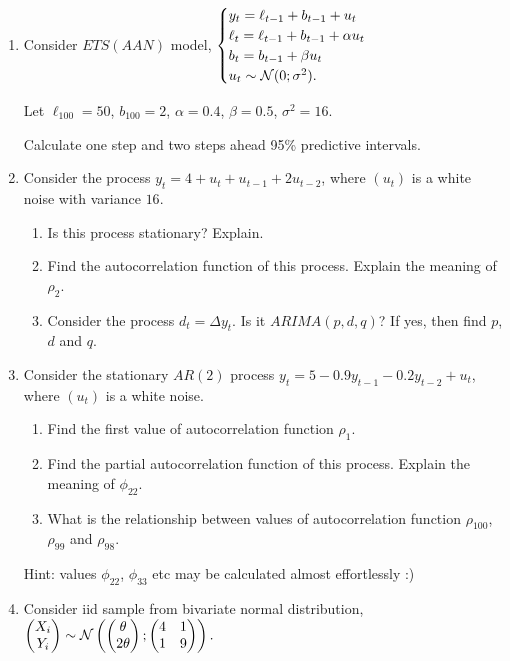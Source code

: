 \begin{enumerate}

\item Consider $ETS(AAN)$ model,
	$
	\begin{cases}
	y_t = \ell_{t-1} + b_{t-1} + u_t \\
	\ell_t = \ell_{t-1} + b_{t-1} + \alpha u_t \\
	b_t = b_{t-1} + \beta u_t \\
	u_t \sim \mathcal{N}(0;\sigma^2). \\
	\end{cases}
	$
		
Let $\ell_{100} = 50$, $b_{100} = 2$, $\alpha=0.4$, $\beta=0.5$, $\sigma^2 = 16$.

Calculate one step and two steps ahead 95\% predictive intervals. 

\item Consider the process $y_t = 4 + u_t + u_{t-1} + 2 u_{t-2}$, where $(u_t)$ is a white noise with variance $16$.

\begin{enumerate}
	\item Is this process stationary? Explain. 
	\item Find the autocorrelation function of this process. Explain the meaning of $\rho_2$.
	\item Consider the process $d_t = \Delta y_t$. Is it $ARIMA(p, d, q)$? If yes, then find $p$, $d$ and $q$.
\end{enumerate}

\item Consider the stationary $AR(2)$ process $y_t = 5 - 0.9y_{t-1} - 0.2y_{t-2} + u_t$, where $(u_t)$ is a white noise. 
\begin{enumerate}
	\item Find the first value of autocorrelation function $\rho_1$.
	\item Find the partial autocorrelation function of this process. Explain the meaning of $\phi_{22}$.
	\item What is the relationship between values of autocorrelation function $\rho_{100}$, $\rho_{99}$ and $\rho_{98}$.
\end{enumerate}

Hint: values $\phi_{22}$, $\phi_{33}$ etc may be calculated almost effortlessly :)

\item Consider iid sample from bivariate normal distribution, 
$
\begin{pmatrix}
	X_i \\
	Y_i \\
\end{pmatrix}	 \sim \mathcal{N} \left(     
\begin{pmatrix}
	\theta \\
	2\theta \\
\end{pmatrix}; 
\begin{pmatrix}
	4 & 1 \\
	1 & 9 \\
\end{pmatrix}
\right).
$


\end{enumerate}
